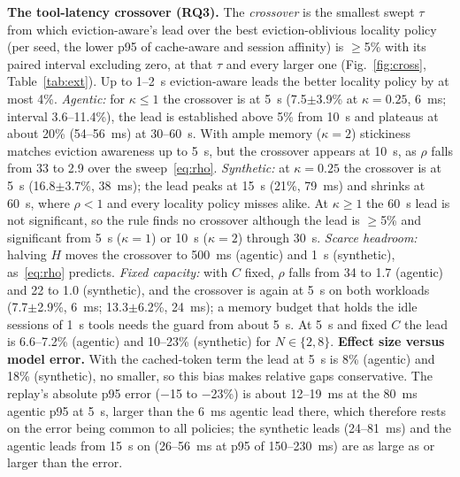\documentclass[conference]{IEEEtran}
\begin{document}
\textbf{The tool-latency crossover (RQ3).} The \emph{crossover} is the smallest swept $\tau$ from which eviction-aware's lead over the best eviction-oblivious locality policy (per seed, the lower p95 of cache-aware and session affinity) is $\ge$5\% with its paired interval excluding zero, at that $\tau$ and every larger one (Fig.~\ref{fig:cross}, Table~\ref{tab:ext}). Up to 1--2~s eviction-aware leads the better locality policy by at most 4\%. \emph{Agentic:} for $\kappa\le1$ the crossover is at 5~s (7.5$\pm$3.9\% at $\kappa=0.25$, 6~ms; interval 3.6--11.4\%), the lead is established above 5\% from 10~s and plateaus at about 20\% (54--56~ms) at 30--60~s. With ample memory ($\kappa=2$) stickiness matches eviction awareness up to 5~s, but the crossover appears at 10~s, as $\rho$ falls from 33 to 2.9 over the sweep~\eqref{eq:rho}. \emph{Synthetic:} at $\kappa=0.25$ the crossover is at 5~s (16.8$\pm$3.7\%, 38~ms); the lead peaks at 15~s (21\%, 79~ms) and shrinks at 60~s, where $\rho<1$ and every locality policy misses alike. At $\kappa\ge1$ the 60~s lead is not significant, so the rule finds no crossover although the lead is $\ge$5\% and significant from 5~s ($\kappa=1$) or 10~s ($\kappa=2$) through 30~s. \emph{Scarce headroom:} halving $H$ moves the crossover to 500~ms (agentic) and 1~s (synthetic), as~\eqref{eq:rho} predicts. \emph{Fixed capacity:} with $C$ fixed, $\rho$ falls from 34 to 1.7 (agentic) and 22 to 1.0 (synthetic), and the crossover is again at 5~s on both workloads (7.7$\pm$2.9\%, 6~ms; 13.3$\pm$6.2\%, 24~ms); a memory budget that holds the idle sessions of 1~s tools needs the guard from about 5~s. At 5~s and fixed $C$ the lead is 6.6--7.2\% (agentic) and 10--23\% (synthetic) for $N\in\{2,8\}$. \textbf{Effect size versus model error.} With the cached-token term the lead at 5~s is 8\% (agentic) and 18\% (synthetic), no smaller, so this bias makes relative gaps conservative. The replay's absolute p95 error ($-$15 to $-$23\%) is about 12--19~ms at the 80~ms agentic p95 at 5~s, larger than the 6~ms agentic lead there, which therefore rests on the error being common to all policies; the synthetic leads (24--81~ms) and the agentic leads from 15~s on (26--56~ms at p95 of 150--230~ms) are as large as or larger than the error.
\end{document}
